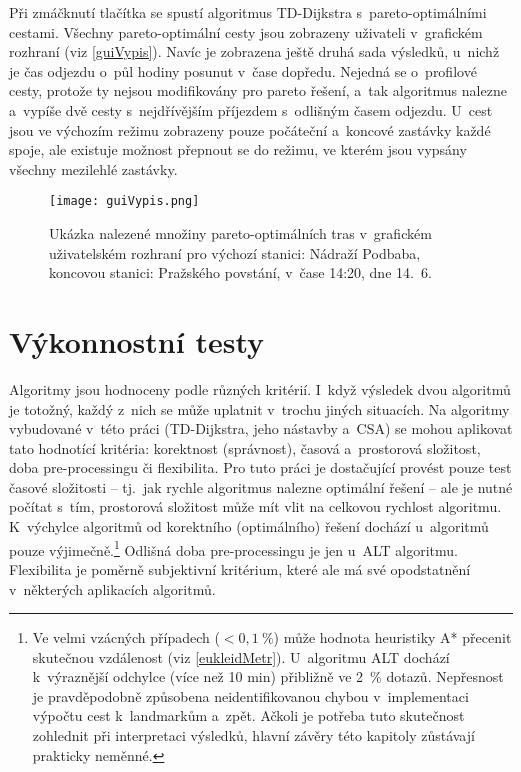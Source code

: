 Při zmáčknutí tlačítka  se spustí algoritmus TD-Dijkstra s~pareto-optimálními cestami. Všechny pareto-optimální cesty jsou zobrazeny uživateli v~grafickém rozhraní (viz \autoref{guiVypis}). Navíc je zobrazena ještě druhá sada výsledků, u~nichž je čas odjezdu o~půl hodiny posunut v~čase dopředu. Nejedná se o~profilové cesty, protože ty nejsou modifikovány pro pareto řešení, a~tak algoritmus nalezne a~vypíše dvě cesty s~nejdřívějším příjezdem s~odlišným časem odjezdu. U~cest jsou ve výchozím režimu zobrazeny pouze počáteční a~koncové zastávky každé spoje, ale existuje možnost přepnout se do režimu, ve kterém jsou vypsány všechny mezilehlé zastávky.

\begin{figure}[htbp]
	\centering
	\centering
	\texttt{[image: guiVypis.png]}
	\caption[Ukázka nalezené množiny pareto-optimálních tras v~grafickém uživatelském rozhraní.]{Ukázka nalezené množiny pareto-optimálních tras v~grafickém uživatelském rozhraní pro výchozí stanici: Nádraží Podbaba, koncovou stanici: Pražského povstání, v~čase 14:20, dne 14.~6.}
	\label{guiVypis}
\end{figure}

\chapter{Výkonnostní testy}
\label{vykonTest}
Algoritmy jsou hodnoceny podle různých kritérií. I~když výsledek dvou algoritmů je totožný, každý z~nich se může uplatnit v~trochu jiných situacích. Na algoritmy vybudované v~této práci (TD-Dijkstra, jeho nástavby a~CSA) se mohou aplikovat tato hodnotící kritéria: korektnost (správnost), časová a~prostorová složitost, doba pre-processingu či flexibilita. Pro tuto práci je dostačující provést pouze test časové složitosti – tj.~jak rychle algoritmus nalezne optimální řešení – ale je nutné počítat s~tím, prostorová složitost může mít vlit na celkovou rychlost algoritmu. K~výchylce algoritmů od korektního (optimálního) řešení dochází u~algoritmů pouze výjimečně.\footnote{Ve velmi vzácných případech ($< 0,1~\%$) může hodnota heuristiky A* přecenit skutečnou vzdálenost (viz \autoref{eukleidMetr}). U~algoritmu ALT dochází k~výraznější odchylce (více než 10 min) přibližně ve 2~\% dotazů. Nepřesnost je pravděpodobně způsobena neidentifikovanou chybou v~implementaci výpočtu cest k~landmarkům a~zpět. Ačkoli je potřeba tuto skutečnost zohlednit při interpretaci výsledků, hlavní závěry této kapitoly zůstávají prakticky neměnné.} Odlišná doba pre-processingu je jen u~ALT algoritmu. Flexibilita je poměrně subjektivní kritérium, které ale má své opodstatnění v~některých aplikacích algoritmů.

